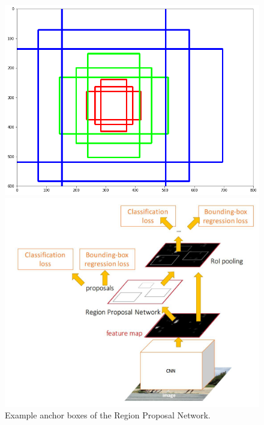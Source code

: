 \documentclass{article}
\begin{document}
\begin{figure}[htbp]
    \centering
    \begin{minipage}{0.4\textwidth}
        \centering
        \includegraphics[width=1\textwidth]{anchors.png} %
        \caption{Example anchor boxes of the Region Proposal Network.}
    \end{minipage}\hfill
    \begin{minipage}{0.6\textwidth}
        \centering
        \includegraphics[width=1\textwidth]{fasterrcnntraining.png} %
    \end{minipage}
\end{figure}
    
\end{document}
